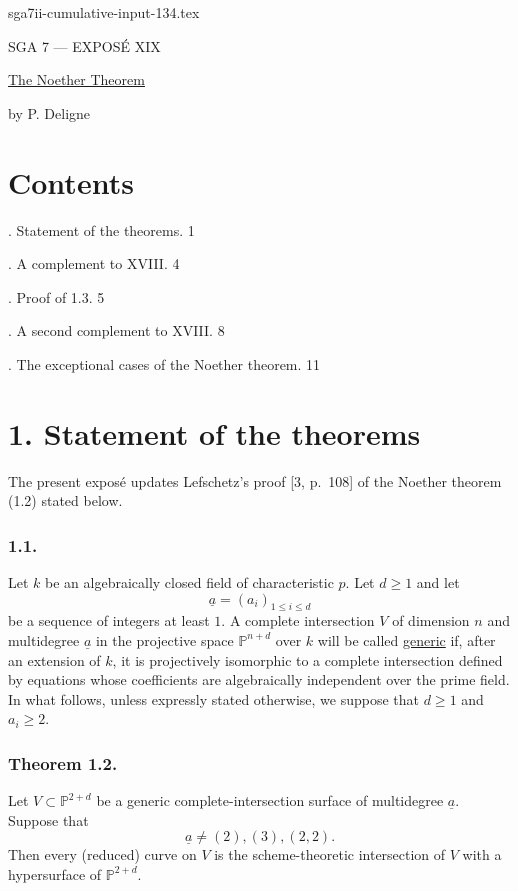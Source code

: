 \begin{filecontents*}{sga7ii-cumulative-input-134.tex}
\clearpage
\begin{center}
{\large SGA 7 --- EXPOS\'E XIX}\par
\vspace{2em}
{\Large\underline{The Noether Theorem}}\par
\vspace{1.5em}
{\large by P. Deligne}
\end{center}

\section*{Contents}

. Statement of the theorems. \hfill 1

. A complement to XVIII. \hfill 4

. Proof of 1.3. \hfill 5

. A second complement to XVIII. \hfill 8

. The exceptional cases of the Noether theorem. \hfill 11

\section*{1. Statement of the theorems}

The present expos\'e updates Lefschetz's proof [3, p.~108] of the Noether
theorem (1.2) stated below.

\subsubsection*{1.1.}
Let $k$ be an algebraically closed field of characteristic $p$.  Let
$d\geq1$ and let
\[
\underline a=(a_i)_{1\leq i\leq d}
\]
be a sequence of integers at least $1$.  A complete intersection $V$ of
dimension $n$ and multidegree $\underline a$ in the projective space
$\mathbb P^{n+d}$ over $k$ will be called \underline{generic} if, after an
extension of $k$, it is projectively isomorphic to a complete intersection
defined by equations whose coefficients are algebraically independent over
the prime field.  In what follows, unless expressly stated otherwise, we
suppose that $d\geq1$ and $a_i\geq2$.

\subsubsection*{Theorem 1.2.}
Let $V\subset\mathbb P^{2+d}$ be a generic complete-intersection surface of
multidegree $\underline a$.  Suppose that
\[
\underline a\ne(2),(3),(2,2).
\]
Then every (reduced) curve on $V$ is the scheme-theoretic intersection of
$V$ with a hypersurface of $\mathbb P^{2+d}$.


\end{filecontents*}
